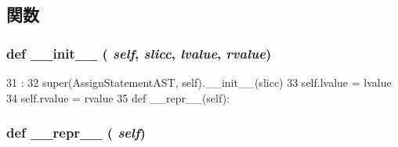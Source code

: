 \subsection{関数}
\hypertarget{classslicc_1_1ast_1_1AssignStatementAST_1_1AssignStatementAST_ac775ee34451fdfa742b318538164070e}{
\subsubsection[{\_\-\_\-init\_\-\_\-}]{\setlength{\rightskip}{0pt plus 5cm}def \_\-\_\-init\_\-\_\- ( {\em self}, \/   {\em slicc}, \/   {\em lvalue}, \/   {\em rvalue})}}
\label{classslicc_1_1ast_1_1AssignStatementAST_1_1AssignStatementAST_ac775ee34451fdfa742b318538164070e}



\begin{DoxyCode}
31                                              :
32         super(AssignStatementAST, self).__init__(slicc)
33         self.lvalue = lvalue
34         self.rvalue = rvalue
35 
    def __repr__(self):
\end{DoxyCode}
\hypertarget{classslicc_1_1ast_1_1AssignStatementAST_1_1AssignStatementAST_ad8b9328939df072e4740cd9a63189744}{
\subsubsection[{\_\-\_\-repr\_\-\_\-}]{\setlength{\rightskip}{0pt plus 5cm}def \_\-\_\-repr\_\-\_\- ( {\em self})}}
\label{classslicc_1_1ast_1_1AssignStatementAST_1_1AssignStatementAST_ad8b9328939df072e4740cd9a63189744}



